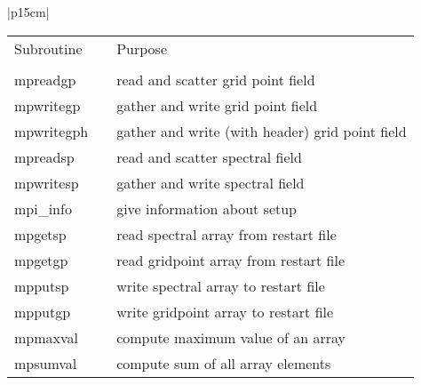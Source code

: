 \begin{center}
\begin{tabular}{|p{15cm}|}
\hline
\begin{center}
\begin{tabular}{l p{2cm} l}
Subroutine & &Purpose \\
&& \\
{\sub mpreadgp}& & read and scatter grid point field \\
{\sub mpwritegp}& & gather and write grid point field \\
{\sub mpwritegph} && gather and write (with header) grid point field \\
{\sub mpreadsp} & &read and scatter spectral field \\
{\sub mpwritesp} &&gather and write spectral field \\
{\sub mpi\_info} && give information about setup \\
{\sub mpgetsp}   && read spectral array from restart file \\
{\sub mpgetgp}   && read gridpoint array from restart file \\
{\sub mpputsp}   && write spectral array to restart file \\
{\sub mpputgp}   && write gridpoint array to restart file \\
{\sub mpmaxval}  && compute maximum value of an array \\
{\sub mpsumval}  && compute sum of all array elements \\
\end{tabular}
\end{center}

\vspace{3mm} \\

\hline
\end{tabular}
\end{center}
\newpage

